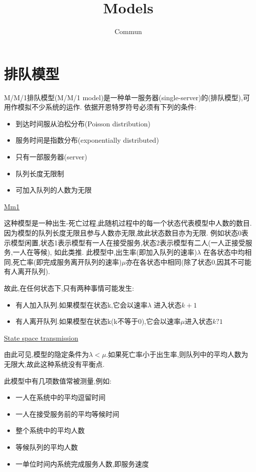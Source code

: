 \documentclass{article}
\begin{document}
\title{Models}
\author{Commun}
\maketitle
\tableofcontents
\newpage

\section{排队模型}
M/M/1排队模型(M/M/1 model)是一种单一服务器(single-server)的(排队模型),可用作模拟不少系统的运作.
依据开恩特罗符号必须有下列的条件:
\begin{itemize}
\item 到达时间服从泊松分布(Poisson distribution)
\item 服务时间是指数分布(exponentially distributed)
\item 只有一部服务器(server)
\item 队列长度无限制
\item 可加入队列的人数为无限
\end{itemize}
\href{http://upload.wikimedia.org/wikipedia/commons/thumb/6/65/Mm1\_queue.svg/292px-Mm1\_queue.svg.png}{Mm1}

这种模型是一种出生-死亡过程,此随机过程中的每一个状态代表模型中人数的数目.因为模型的队列长度无限且参与人数亦无限,故此状态数目亦为无限.
例如状态0表示模型闲置,状态1表示模型有一人在接受服务,状态2表示模型有二人(一人正接受服务,一人在等候),
如此类推. 此模型中,出生率(即加入队列的速率)$\lambda$ 在各状态中均相同,死亡率(即完成服务离开队列的速率)$\mu$亦在各状态中相同(除了状态0,因其不可能有人离开队列).

故此,在任何状态下,只有两种事情可能发生:
\begin{itemize}
\item 有人加入队列.如果模型在状态k,它会以速率$\lambda$ 进入状态$k + 1$
\item 有人离开队列.如果模型在状态k(k不等于0),它会以速率$\mu$进入状态$k ? 1$
\end{itemize}

\href{http://upload.wikimedia.org/wikipedia/commons/thumb/e/e6/MM1\_queue\_state\_space.svg/605px-MM1\_queue\_state\_space.svg.png}{State space transmission}

由此可见,模型的隐定条件为$\lambda < \mu$.如果死亡率小于出生率,则队列中的平均人数为无限大,故此这种系统没有平衡点.

此模型中有几项数值常被测量,例如:
\begin{itemize}
\item 一人在系统中的平均逗留时间
\item 一人在接受服务前的平均等候时间
\item 整个系统中的平均人数
\item 等候队列的平均人数
\item 一单位时间内系统完成服务人数,即服务速度
\end{itemize}
\end{document}
